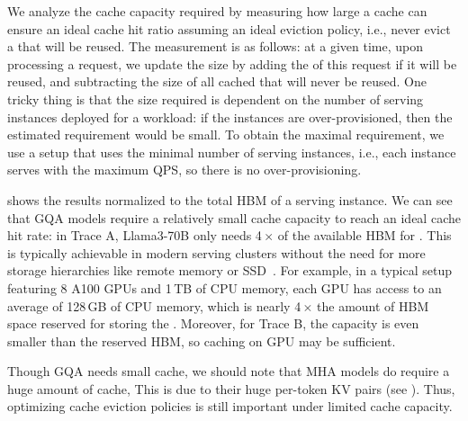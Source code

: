 We analyze the {\kvcache} cache capacity required
by measuring how large a cache can ensure an ideal cache hit ratio
assuming an ideal eviction policy,
i.e., never evict a {\kvcache} that will be reused.
The measurement is as follows:
at a given time, upon processing a request,
we update the {\kvcache} size by adding the {\kvcache}
of this request if it will be reused,
and subtracting the size of all cached {\kvcache} that will never be reused.
One tricky thing is that
the size required is dependent on the number of serving instances deployed for a workload:
if the instances are over-provisioned, then the estimated requirement would be small.
To obtain the maximal requirement,
we use a setup that uses the minimal number of serving instances,
i.e., each instance serves with the maximum QPS,
so there is no over-provisioning.

{} shows the results normalized to the
total HBM of a serving instance.
We can see that GQA models require a relatively small cache capacity to reach an ideal cache hit rate:
in Trace A, Llama3-70B only needs 4\,$\times$ of the available HBM for {\kvcache}.
This is typically achievable in modern serving clusters without the need for more storage hierarchies
like remote memory or SSD~\cite{cachedattention}.
For example, in a typical setup featuring 8 A100 GPUs and 1\,TB of CPU memory,
each GPU has access to an average of 128\,GB of CPU memory,
which is nearly 4\,$\times$ the amount of HBM space reserved for storing the {\kvcache}.
Moreover, for Trace B, the {\kvcache} capacity is even smaller than the reserved HBM,
so caching on GPU may be sufficient.

Though GQA needs small cache, 
we should note that MHA models do require a huge amount of {\kvcache} cache,
This is due to their huge per-token KV pairs (see {}). 
Thus, optimizing cache eviction policies is still important under 
limited cache capacity. 



